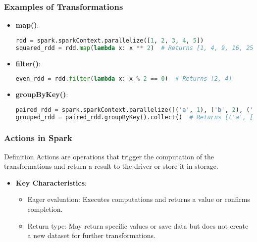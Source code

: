 \documentclass[aspectratio=169]{beamer}
\begin{document}
\begin{frame}[fragile]
  \frametitle{Examples of Transformations}
  \begin{itemize}
    \item \textbf{map()}:
    \begin{lstlisting}[language=Python]
rdd = spark.sparkContext.parallelize([1, 2, 3, 4, 5])
squared_rdd = rdd.map(lambda x: x ** 2)  # Returns [1, 4, 9, 16, 25]
    \end{lstlisting}
    
    \item \textbf{filter()}:
    \begin{lstlisting}[language=Python]
even_rdd = rdd.filter(lambda x: x % 2 == 0)  # Returns [2, 4]
    \end{lstlisting}
    
    \item \textbf{groupByKey()}:
    \begin{lstlisting}[language=Python]
paired_rdd = spark.sparkContext.parallelize([('a', 1), ('b', 2), ('a', 3)])
grouped_rdd = paired_rdd.groupByKey().collect()  # Returns [('a', [1, 3]), ('b', [2])]
    \end{lstlisting}
  \end{itemize}
\end{frame}

\begin{frame}[fragile]
  \frametitle{Actions in Spark}
  \begin{block}{Definition}
    Actions are operations that trigger the computation of the transformations and return a result to the driver or store it in storage.
  \end{block}
  
  \begin{itemize}
    \item \textbf{Key Characteristics}:
    \begin{itemize}
      \item Eager evaluation: Executes computations and returns a value or confirms completion.
      \item Return type: May return specific values or save data but does not create a new dataset for further transformations.
    \end{itemize}
  \end{itemize}
\end{frame}
\end{document}

